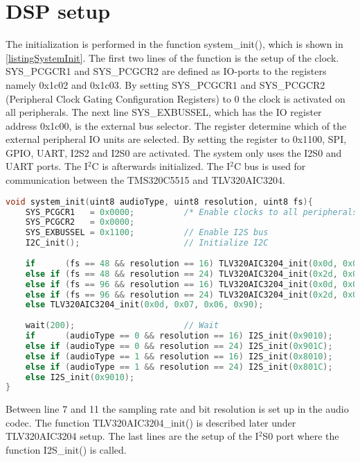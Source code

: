 \chapter{DSP setup} \label{app:DSPSetup}

The initialization is performed in the function system\_init(), which is shown in \autoref{listingSystemInit}. The first two lines of the function is the setup of the clock. SYS\_PCGCR1 and SYS\_PCGCR2 are defined as IO-ports to the registers namely 0x1c02 and 0x1c03. By setting SYS\_PCGCR1 and SYS\_PCGCR2 (Peripheral Clock Gating Configuration Registers) to 0 the clock is activated on all peripherals. The next line SYS\_EXBUSSEL, which has the IO register address 0x1c00, is the external bus selector. The register determine which of the external peripheral IO units are selected. By setting the register to 0x1100, SPI, GPIO, UART, I2S2 and I2S0 are activated. The system only uses the I2S0 and UART ports. The I$^2$C is afterwards initialized. The I$^2$C bus is used for communication between the TMS320C5515 and TLV320AIC3204.

\begin{lstlisting}[language=C, caption = {System initialization},label={listingSystemInit}]
void system_init(uint8 audioType, uint8 resolution, uint8 fs){
    SYS_PCGCR1 	 = 0x0000;     		/* Enable clocks to all peripherals */
    SYS_PCGCR2 	 = 0x0000;
	SYS_EXBUSSEL = 0x1100;         	// Enable I2S bus
	I2C_init();        				// Initialize I2C
	
	if 		(fs == 48 && resolution == 16) TLV320AIC3204_init(0x0d, 0x07, 0x06, 0x90);
	else if (fs == 48 && resolution == 24) TLV320AIC3204_init(0x2d, 0x07, 0x06, 0x90);	
	else if (fs == 96 && resolution == 16) TLV320AIC3204_init(0x0d, 0x0E, 0x0D, 0x20);	
	else if	(fs == 96 && resolution == 24) TLV320AIC3204_init(0x2d, 0x0E, 0x0D, 0x20);
	else TLV320AIC3204_init(0x0d, 0x07, 0x06, 0x90);	
	
	wait(200);        				// Wait	
	if 		(audioType == 0 && resolution == 16) I2S_init(0x9010);
	else if (audioType == 0 && resolution == 24) I2S_init(0x901C);	
	else if (audioType == 1 && resolution == 16) I2S_init(0x8010);	
	else if	(audioType == 1 && resolution == 24) I2S_init(0x801C);
	else I2S_init(0x9010);
}
\end{lstlisting}
Between line 7 and 11 the sampling rate and bit resolution is set up in the audio codec. The function TLV320AIC3204\_init() is described later under TLV320AIC3204 setup. The last lines are the setup of the I$^2$S0 port where the function I2S\_init() is called.

